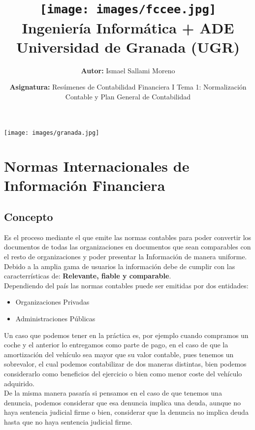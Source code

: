 \documentclass[a4paper,12pt]{article}
\title{
    \vspace{-2cm}
    \texttt{[image: images/fccee.jpg]} \\ %
    \LARGE Ingeniería Informática + ADE\\
    \large Universidad de Granada (UGR)\\[1cm]
}
\author{\textbf{Autor:} Ismael Sallami Moreno}
\date{\textbf{Asignatura:} Resúmenes de Contabilidad Financiera I Tema 1: Normalización Contable y Plan General de Contabilidad}
\begin{document}
\maketitle
\thispagestyle{empty}

\begin{center}
    \texttt{[image: images/granada.jpg]} \\ %
    \vfill
\end{center}

\newpage

\tableofcontents
\newpage


\section{Normas Internacionales de Información Financiera}

\subsection{Concepto}
Es el proceso mediante el que emite las normas contables para poder convertir los documentos de todas las organizaciones en documentos que sean comparables con el resto de organizaciones y poder presentar la Información de manera uniforme. Debido a la amplia gama de usuarios la información debe de cumplir con las caracterrísticas de: \textbf{Relevante, fiable y comparable}.\\

Dependiendo del país las normas contables puede ser emitidas por dos entidades:
\begin{itemize}
    \item Organizaciones Privadas
    \item Administraciones Públicas
\end{itemize}

Un caso que podemos tener en la práctica es, por ejemplo cuando compramos un coche y el anterior lo entregamos como parte de pago, en el caso de que la amortización del vehículo sea mayor que su valor contable, pues tenemos un sobrevalor, el cual podemos contabilizar de dos maneras distintas, bien podemos considerarlo como beneficios del ejercicio o bien como menor coste del vehículo adquirido.\\

De la misma manera pasaría si pensamos en el caso de que tenemos una denuncia, podemos considerar que esa denuncia implica una deuda, aunque no haya sentencia judicial firme o bien, considerar que la denuncia no implica deuda hasta que no haya sentencia judicial firme.\\
\end{document}
